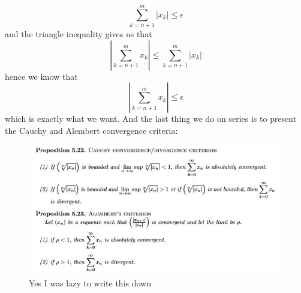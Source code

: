 \documentclass{article}
\numberwithin{equation}{subsection}
\begin{document}
$$ \sum_{k=n+1}^{m} |x_{k}| \leq \epsilon$$ and the triangle inequality gives us that $$ |\sum_{k=n+1}^{m} x_{k}| \leq \sum_{k=n+1}^{m} |x_{k}| $$ hence we know that $$  |\sum_{k=n+1}^{m} x_{k}| \leq \epsilon$$ which is exactly what we want. 
And the last thing we do on series is to present the Cauchy and Alembert convergence criteria:

\begin{figure}[H]
    \centering
    \includegraphics{epflSemesterOne/analysis/figures/series.JPG}
    \caption{Yes I was lazy to write this down}
    \label{fig:my_label}
\end{figure}


  
\end{document}
